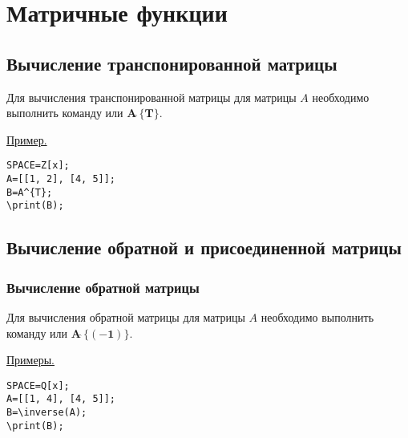 \chapter{Матричные функции}
\section{Вычисление транспонированной матрицы}
Для вычисления транспонированной матрицы для матрицы $A$ необходимо выполнить команду 
  или $\mathbf{A\widehat{\ } \{T\}}$. 

\underline{Пример. }

\vspace*{-2mm}
\begin{verbatim}
SPACE=Z[x]; 
A=[[1, 2], [4, 5]];
B=A^{T}; 
\print(B);
\end{verbatim}


\section{Вычисление обратной и присоединенной матрицы }
\subsection{Вычисление обратной матрицы}

Для вычисления обратной матрицы для матрицы $A$ необходимо выполнить команду  
  или $\mathbf{A\widehat{\ } \{(-1)\}}$. 

\underline{Примеры. }

\vspace*{-2mm}
\begin{verbatim}
SPACE=Q[x]; 
A=[[1, 4], [4, 5]];
B=\inverse(A); 
\print(B);
\end{verbatim}

